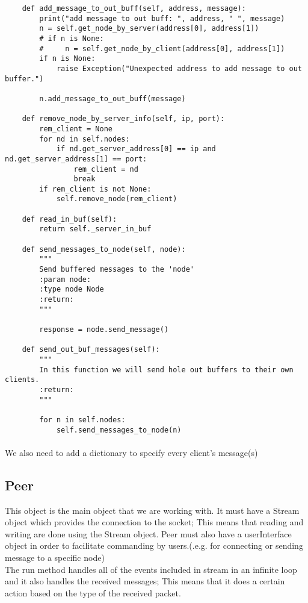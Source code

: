 \documentclass{article}
\begin{document}
\begin{lstlisting}
    def add_message_to_out_buff(self, address, message):
        print("add message to out buff: ", address, " ", message)
        n = self.get_node_by_server(address[0], address[1])
        # if n is None:
        #     n = self.get_node_by_client(address[0], address[1])
        if n is None:
            raise Exception("Unexpected address to add message to out buffer.")

        n.add_message_to_out_buff(message)

    def remove_node_by_server_info(self, ip, port):
        rem_client = None
        for nd in self.nodes:
            if nd.get_server_address[0] == ip and nd.get_server_address[1] == port:
                rem_client = nd
                break
        if rem_client is not None:
            self.remove_node(rem_client)

    def read_in_buf(self):
        return self._server_in_buf

    def send_messages_to_node(self, node):
        """
        Send buffered messages to the 'node'
        :param node:
        :type node Node
        :return:
        """

        response = node.send_message()

    def send_out_buf_messages(self):
        """
        In this function we will send hole out buffers to their own clients.
        :return:
        """

        for n in self.nodes:
            self.send_messages_to_node(n)
\end{lstlisting}
\paragraph{}We also need to add a dictionary to specify every client's message(s)
\subsection{Peer}This object is the main object that we are working with. It must have a Stream object which provides the connection to the socket; This means that reading and writing are done using the Stream object. Peer must also have a userInterface object in order to facilitate commanding by users.(.e.g. for connecting or sending message to a specific node)\\
The run method handles all of the events included in stream in an infinite loop and it also handles the received messages; This means that it does a certain action based on the type of the received packet.
\end{document}
